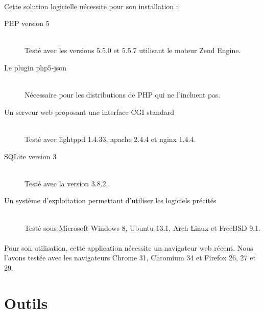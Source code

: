     \paragraph{}
        Cette solution logicielle nécessite pour son installation :
        \begin{description}
            \item[PHP version 5]\hfill \\
                Testé avec les versions 5.5.0 et 5.5.7 utilisant le moteur
                Zend Engine.
            \item[Le plugin php5-json]\hfill \\
                Nécessaire pour les distributions de PHP qui ne l'incluent pas.
            \item[Un serveur web proposant une interface CGI standard]\hfill \\
                Testé avec lightppd 1.4.33, apache 2.4.4 et nginx 1.4.4.
            \item[SQLite version 3]\hfill \\
                Testé avec la version 3.8.2.
            \item[Un système d'exploitation permettant d'utiliser les logiciels précités]\hfill \\
                Testé sous Microsoft Windows 8, Ubuntu 13.1, Arch Linux et
                FreeBSD 9.1.
        \end{description}

    \paragraph{}
        Pour son utilisation, cette application nécessite un navigateur web
        récent. Nous l'avons testée avec les navigateurs Chrome 31, Chromium
        34 et Firefox 26, 27 et 29.

\section{Outils}
